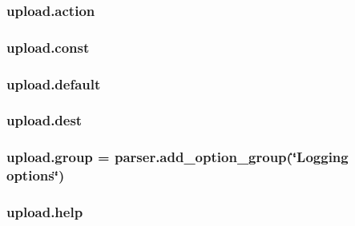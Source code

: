 \subsubsection[{\texorpdfstring{action}{action}}]{\setlength{\rightskip}{0pt plus 5cm}upload.\+action}\hypertarget{namespaceupload_a675d13c979f1c720866d22ed1736f580}{}\label{namespaceupload_a675d13c979f1c720866d22ed1736f580}
\subsubsection[{\texorpdfstring{const}{const}}]{\setlength{\rightskip}{0pt plus 5cm}upload.\+const}\hypertarget{namespaceupload_a985aa9a71de3eb507344df65700c696d}{}\label{namespaceupload_a985aa9a71de3eb507344df65700c696d}
\subsubsection[{\texorpdfstring{default}{default}}]{\setlength{\rightskip}{0pt plus 5cm}upload.\+default}\hypertarget{namespaceupload_af4be925d9a50d5ad134d86400509d0f2}{}\label{namespaceupload_af4be925d9a50d5ad134d86400509d0f2}
\subsubsection[{\texorpdfstring{dest}{dest}}]{\setlength{\rightskip}{0pt plus 5cm}upload.\+dest}\hypertarget{namespaceupload_a770d9c7b49b1fede80de6078d5e49af7}{}\label{namespaceupload_a770d9c7b49b1fede80de6078d5e49af7}
\subsubsection[{\texorpdfstring{group}{group}}]{\setlength{\rightskip}{0pt plus 5cm}upload.\+group = parser.\+add\+\_\+option\+\_\+group(\char`\"{}Logging options\char`\"{})}\hypertarget{namespaceupload_a9d33d66de17175dced88ffe95f079226}{}\label{namespaceupload_a9d33d66de17175dced88ffe95f079226}
\subsubsection[{\texorpdfstring{help}{help}}]{\setlength{\rightskip}{0pt plus 5cm}upload.\+help}\hypertarget{namespaceupload_abfc23c9aa2d9b777678da117a85929a5}{}\label{namespaceupload_abfc23c9aa2d9b777678da117a85929a5}
